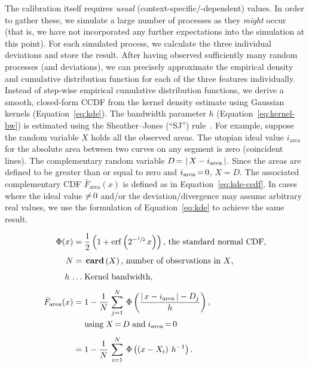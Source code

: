 The calibration itself requires \emph{usual} (context-specific/-dependent) values.
In order to gather these, we simulate a large number of processes as they \emph{might} occur (that is, we have not incorporated any further expectations into the simulation at this point).
For each simulated process, we calculate the three individual deviations and store the result.
After having observed sufficiently many random processes (and deviations), we can precisely approximate the empirical density and cumulative distribution function for each of the three features individually.
Instead of step-wise empirical cumulative distribution functions, we derive a smooth, closed-form CCDF from the kernel density estimate using Gaussian kernels (Equation~\ref{eq:kde}).
The bandwidth parameter $h$ (Equation~\ref{eq:kernel-bw}) is estimated using the Sheather--Jones (``SJ'') rule~\cite{sj1991bandwidth}.
For example, suppose the random variable $X$ holds all the observed areas.
The utopian ideal value $i_{\operatorname{area}}$ for the absolute area between two curves on any segment is zero (coincident lines).
The complementary random variable $D\,{=}\,\left\lvert\,X-i_{\operatorname{area}}\,\right\rvert$.
Since the areas are defined to be greater than or equal to zero and $i_{\operatorname{area}}\,{=}\,0$, $X=D$.
The associated complementary CDF $\bar{F}_{\operatorname{area}}(x)$ is defined as in Equation~\eqref{eq:kde-ccdf}.
In cases where the ideal value ${\neq}\,0$ and/or the deviation/divergence may assume arbitrary real values, we use the formulation of Equation~\eqref{eq:kde} to achieve the same result.


\begin{align}
    \Phi(x)=&\;\frac{1}{2}\left(1+\operatorname{erf}\left(2^{-\sfrac{1}{2}}\,x\right)\right)\text{, the standard normal CDF,}\nonumber
    \\[1ex]
    N=&\;\operatorname{\mathbf{card}}\left(X\right)\text{, number of observations in $X$,}\nonumber
    \\[1ex]
    h\,\ldots&\;\text{Kernel bandwidth,}\label{eq:kernel-bw}
    \\[1ex]
    \bar{F}_{\operatorname{area}}(x)=&\;1-\frac{1}{N}\,\sum_{j=1}^{N}\,\Phi\left(\frac{\left\lvert\,x-i_{\operatorname{area}}\,\right\rvert-D_j}{h}\right),\label{eq:kde}
    \\[0ex]
    &\;\text{using}\;X\,{=}\,D\;\text{and}\;i_{\operatorname{area}}\,{=}\,0\nonumber
    \\[1ex]
    =&\;1-\frac{1}{N}\,\sum_{i=1}^{N}\,\Phi\left(\left(x-X_{i}\right)\,h^{-1}\right).\label{eq:kde-ccdf}
\end{align}


